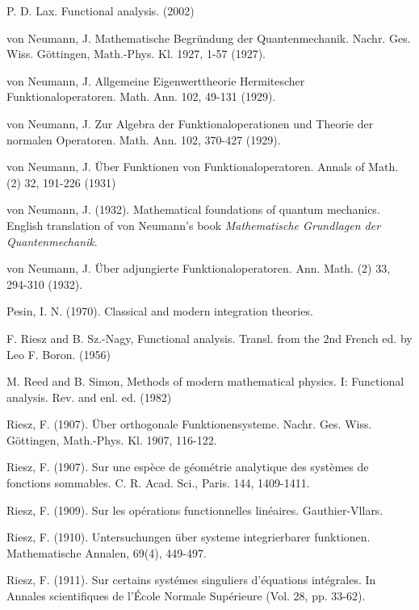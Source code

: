 \documentclass[12pt,b5paper,notitlepage]{article}
\theoremstyle{definition}
\theoremstyle{plain}
\numberwithin{equation}{section}
\begin{document}
\begin{thebibliography}{999999}
P. D. Lax. Functional analysis. (2002)

von Neumann, J. Mathematische {Begr{\"u}ndung} der {Quantenmechanik}. Nachr. Ges. Wiss. G{\"o}ttingen, Math.-Phys. Kl. 1927, 1-57 (1927).


von Neumann, J. Allgemeine Eigenwerttheorie Hermitescher Funktionaloperatoren. Math. Ann. 102, 49-131 (1929).


von Neumann, J. Zur Algebra der Funktionaloperationen und Theorie der normalen Operatoren. Math. Ann. 102, 370-427 (1929).



von Neumann, J. \"Uber Funktionen von Funktionaloperatoren. Annals of Math. (2) 32, 191-226 (1931)


von Neumann, J. (1932). Mathematical foundations of quantum mechanics. English translation of von Neumann's book \textit{Mathematische Grundlagen der Quantenmechanik}.



von Neumann, J. {\"U}ber adjungierte {Funktionaloperatoren}. Ann. Math. (2) 33, 294-310 (1932).



Pesin, I. N. (1970). Classical and modern integration theories.


F. Riesz and B. Sz.-Nagy, Functional analysis. Transl. from the 2nd French ed. by Leo F.
Boron. (1956)

M. Reed and B. Simon, Methods of modern mathematical physics. {I}: {Functional} analysis. {Rev}. and enl. ed. (1982)

Riesz, F. (1907). \"Uber orthogonale Funktionensysteme. Nachr. Ges. Wiss. G{\"o}ttingen, Math.-Phys. Kl.  1907, 116-122.


Riesz, F. (1907). Sur une esp{\`e}ce de g{\'e}om{\'e}trie analytique des syst{\`e}mes de fonctions sommables. C. R. Acad. Sci., Paris.  144, 1409-1411.



Riesz, F. (1909). Sur les op\'erations functionnelles lin\'eaires. Gauthier-Vllars.

Riesz, F. (1910). Untersuchungen \"uber systeme integrierbarer funktionen. Mathematische Annalen, 69(4), 449-497.


Riesz, F. (1911). Sur certains syst\'emes singuliers d'\'equations int\'egrales. In Annales scientifiques de l'\'Ecole Normale Sup\'erieure (Vol. 28, pp. 33-62).


\end{thebibliography}
\end{document}
